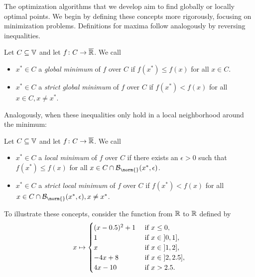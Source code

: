 The optimization algorithms that we develop aim to find globally or locally optimal points.
We begin by defining these concepts more rigorously, focusing on minimization problems.
Definitions for maxima follow analogously by reversing inequalities.
\begin{definition}%
	\label{def:global minimum}
	Let \( C \subseteq \mathbb{V} \) and let \( f \colon C \to \overline{\mathbb{R}} \).
	We call
	\begin{itemize}
		\item \( x^\ast \in C \) a \emph{global minimum} of \( f \) over \( C \) if \( f(x^\ast) \leq f(x) \) for all \( x \in C \).
		\item \( x^\ast \in C \) a \emph{strict global minimum} of \( f \) over \( C \) if \( f(x^\ast) < f(x) \) for all \( x \in C, x \neq x^\ast \).
	\end{itemize}
\end{definition}
Analogously, when these inequalities only hold in a local neighborhood around the minimum:
\begin{definition}%
	\label{def:local minimum}
	Let \( C \subseteq \mathbb{V} \) and let \( f \colon C \to \overline{\mathbb{R}} \).
	We call
	\begin{itemize}
		\item \( x^\ast \in C \) a \emph{local minimum} of \( f \) over \( C \) if there exists an \( \epsilon > \num{0} \) such that \( f(x^\ast) \leq f(x) \) for all \( x \in C \cap \Ball{\norm{}}{x^\ast}{\epsilon} \).
		\item \( x^\ast \in C \) a \emph{strict local minimum} of \( f \) over \( C \) if \( f(x^\ast) < f(x) \) for all \( x \in C \cap \Ball{\norm{}}{x^\ast}{\epsilon}, x \neq x^\ast \).
	\end{itemize}
\end{definition}
To illustrate these concepts, consider the function from \( \mathbb{R} \) to \( \mathbb{R} \) defined by
\begin{equation}
	x \mapsto \begin{cases}
		(x - \num{0.5})^{\num{2}} + \num{1} & \text{ if } x \leq \num{0}, \\
		\num{1} & \text{ if } x \in \linterval{\num{0}}{\num{1}}, \\
		x & \text{ if } x \in \linterval{\num{1}}{\num{2}}, \\
		-\num{4}x + \num{8} & \text{ if } x \in \linterval{\num{2}}{\num{2.5}}, \\
		\num{4}x - \num{10} & \text { if } x > \num{2.5}.
	\end{cases}
\end{equation}
